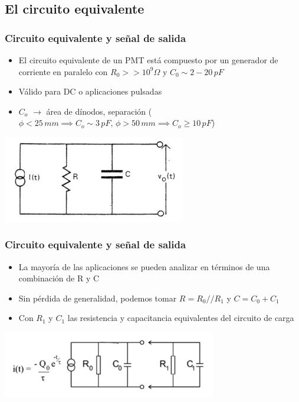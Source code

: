 \documentclass{beamer}
\begin{document}
\subsection{El circuito equivalente}

\begin{frame}
\frametitle{Circuito equivalente y señal de salida}
\begin{itemize}
\item El circuito equivalente de un PMT está compuesto por un generador de
corriente en paralelo con $R_0 >> 10^9 \Omega$ y $C_0 \sim 2 - 20\,pF$
\item Válido para DC o aplicaciones pulsadas
\item $C_o$ $\rightarrow$ área de dínodos, separación ($\phi < 25\,mm \implies
C_o \sim 3\,pF,\, \phi > 50\,mm \implies C_o \geq 10\,pF$)
\end{itemize}
\begin{center}
\includegraphics[width=0.6\textwidth]{d1/modelo_PMT}
\end{center}
\end{frame} 

\begin{frame}
\frametitle{Circuito equivalente y señal de salida}
\begin{itemize}
\item La mayoría de las aplicaciones se pueden analizar en términos de una
combinación de R y C
\item Sin pérdida de generalidad, podemos tomar $R = R_0 // R_1$ y $C = C_0 + C_1$
\item Con $R_1$ y $C_1$ las resistencia y capacitancia equivalentes del circuito
de carga
\end{itemize}
\begin{center}
\includegraphics[width=0.7\textwidth]{d1/modelo2_PMT}
\end{center}
\end{frame} 
\end{document}
